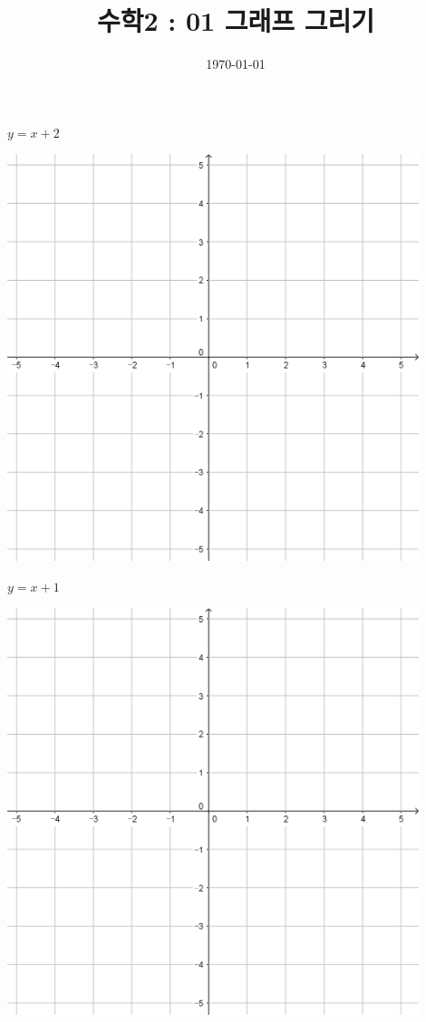 \documentclass{oblivoir}
\begin{document}
\title{수학2 : 01 그래프 그리기}
\author{}
\date{\today}
\maketitle

\begin{minipage}{0.45\textwidth}\centering
\(y=x+2\)
\par\bigskip\includegraphics[width=0.9\textwidth]{55}
\end{minipage}
\begin{minipage}{0.45\textwidth}\centering
\(y=x+1\)
\par\bigskip\includegraphics[width=0.9\textwidth]{55}
\end{minipage}\bigskip\bigskip\par
\end{document}
